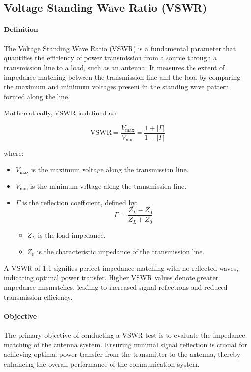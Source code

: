 \documentclass[12pt,letter]{article}
\begin{document}
\subsection*{Voltage Standing Wave Ratio (VSWR)}

\paragraph{Definition}
The Voltage Standing Wave Ratio (VSWR) is a fundamental parameter that quantifies the efficiency of power transmission from a source through a transmission line to a load, such as an antenna. It measures the extent of impedance matching between the transmission line and the load by comparing the maximum and minimum voltages present in the standing wave pattern formed along the line.

Mathematically, VSWR is defined as:

\[
\text{VSWR} = \frac{V_{\text{max}}}{V_{\text{min}}} = \frac{1 + |\Gamma|}{1 - |\Gamma|}
\]

where:
\begin{itemize}
    \item \( V_{\text{max}} \) is the maximum voltage along the transmission line.
    \item \( V_{\text{min}} \) is the minimum voltage along the transmission line.
    \item \( \Gamma \) is the reflection coefficient, defined by:
    \[
    \Gamma = \frac{Z_L - Z_0}{Z_L + Z_0}
    \]
    \begin{itemize}
        \item \( Z_L \) is the load impedance.
        \item \( Z_0 \) is the characteristic impedance of the transmission line.
    \end{itemize}
\end{itemize}

A VSWR of 1:1 signifies perfect impedance matching with no reflected waves, indicating optimal power transfer. Higher VSWR values denote greater impedance mismatches, leading to increased signal reflections and reduced transmission efficiency.

\paragraph*{Objective}
The primary objective of conducting a VSWR test is to evaluate the impedance matching of the antenna system. Ensuring minimal signal reflection is crucial for achieving optimal power transfer from the transmitter to the antenna, thereby enhancing the overall performance of the communication system.
\end{document}
